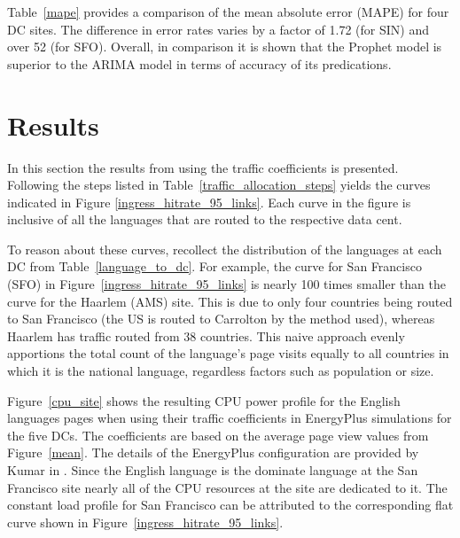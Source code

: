     
    
    Table~\ref{mape} provides a comparison of the mean absolute error (MAPE) for four DC sites. The difference in error rates varies by a factor of 1.72 (for SIN) and over 52 (for SFO). Overall, in comparison it is shown that the Prophet model is superior to the ARIMA model in terms of accuracy of its predications. 
    
    
\section {Results}

    In this section the results from using the traffic coefficients is presented. Following the steps listed in Table~\ref{traffic_allocation_steps} yields the curves indicated in Figure \ref{ingress_hitrate_95_links}. Each curve in the figure is inclusive of all the languages that are routed to the respective data cent. 
    
    To reason about these curves, recollect the distribution of the languages at each DC from Table~\ref{language_to_dc}. For example, the curve for San Francisco (SFO) in Figure~\ref{ingress_hitrate_95_links} is nearly 100 times smaller than the curve for the Haarlem (AMS) site. This is due to only four countries being routed to San Francisco (the US is routed to Carrolton by the method used), whereas Haarlem has traffic routed from 38 countries. This naive approach evenly apportions the total count of the language's page visits equally to all countries in which it is the national language, regardless factors such as population or size.   
    
    Figure~\ref{cpu_site} shows the resulting CPU power profile for the English languages pages when using their traffic coefficients in EnergyPlus simulations for the five DCs. The coefficients are based on the average page view values from Figure~\ref{mean}. The details of the EnergyPlus configuration are provided by Kumar in \cite{kumar20, kumar20b}. Since the English language is the dominate language at the San Francisco site nearly all of the CPU resources at the site are dedicated to it. The constant load profile for San Francisco can be attributed to the corresponding flat curve shown in Figure~\ref{ingress_hitrate_95_links}. 
    
    
    
